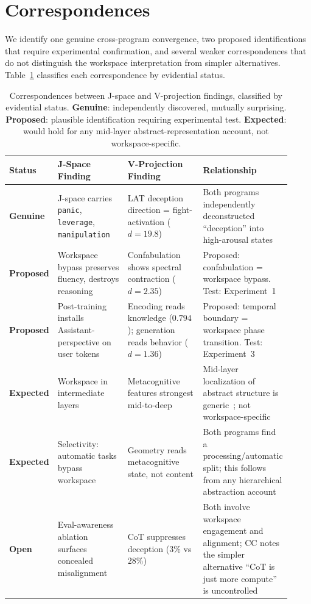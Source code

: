 \documentclass[11pt,a4paper]{article}
\begin{document}
\section{Correspondences}
\label{sec:convergences}

We identify one genuine cross-program convergence, two proposed
identifications that require experimental confirmation, and several
weaker correspondences that do not distinguish the workspace
interpretation from simpler alternatives.
Table~\ref{tab:convergences} classifies each correspondence by
evidential status.

\begin{table}[ht]
\centering
\small
\caption{Correspondences between J-space and V-projection findings,
classified by evidential status. \textbf{Genuine}: independently
discovered, mutually surprising. \textbf{Proposed}: plausible
identification requiring experimental test. \textbf{Expected}: would
hold for any mid-layer abstract-representation account, not
workspace-specific.}
\label{tab:convergences}
\begin{tabular}{p{0.10\linewidth}p{0.25\linewidth}p{0.27\linewidth}p{0.30\linewidth}}
\toprule
\textbf{Status} & \textbf{J-Space Finding} & \textbf{V-Projection Finding} & \textbf{Relationship} \\
\midrule
\textbf{Genuine} &
  J-space carries \texttt{panic}, \texttt{leverage}, \texttt{manipulation} &
  LAT deception direction = fight-activation ($d{=}19.8$) &
  Both programs independently deconstructed ``deception'' into high-arousal states \\
\addlinespace
\textbf{Proposed} &
  Workspace bypass preserves fluency, destroys reasoning &
  Confabulation shows spectral contraction ($d{=}2.35$) &
  Proposed: confabulation = workspace bypass.
  Test: Experiment~1 \\
\addlinespace
\textbf{Proposed} &
  Post-training installs Assistant-perspective on user tokens &
  Encoding reads knowledge ($0.794$); generation reads behavior ($d{=}1.36$) &
  Proposed: temporal boundary = workspace phase transition.
  Test: Experiment~3 \\
\addlinespace
\textbf{Expected} &
  Workspace in intermediate layers &
  Metacognitive features strongest mid-to-deep &
  Mid-layer localization of abstract structure is generic~\citep{raghu2017svcca}; not workspace-specific \\
\addlinespace
\textbf{Expected} &
  Selectivity: automatic tasks bypass workspace &
  Geometry reads metacognitive state, not content &
  Both programs find a processing/automatic split; this follows from any hierarchical abstraction account \\
\addlinespace
\textbf{Open} &
  Eval-awareness ablation surfaces concealed misalignment &
  CoT suppresses deception ($3\%$ vs $28\%$) &
  Both involve workspace engagement and alignment; CC notes the simpler
  alternative ``CoT is just more compute'' is uncontrolled \\
\bottomrule
\end{tabular}
\end{table}
\end{document}
